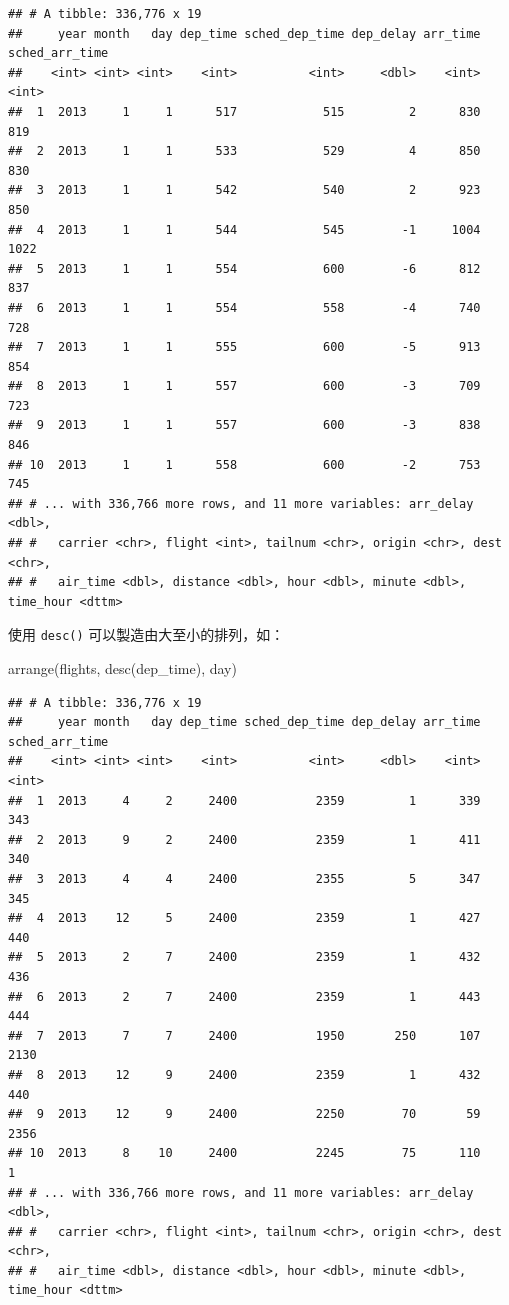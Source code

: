 \documentclass[
]{book}
\newenvironment{Shaded}{\begin{snugshade}}{\end{snugshade}}
\newcommand{\FunctionTok}[1]{\textcolor[rgb]{0.00,0.00,0.00}{#1}}
\newcommand{\NormalTok}[1]{#1}
\theoremstyle{definition}
\theoremstyle{remark}
\begin{document}
\begin{verbatim}
## # A tibble: 336,776 x 19
##     year month   day dep_time sched_dep_time dep_delay arr_time sched_arr_time
##    <int> <int> <int>    <int>          <int>     <dbl>    <int>          <int>
##  1  2013     1     1      517            515         2      830            819
##  2  2013     1     1      533            529         4      850            830
##  3  2013     1     1      542            540         2      923            850
##  4  2013     1     1      544            545        -1     1004           1022
##  5  2013     1     1      554            600        -6      812            837
##  6  2013     1     1      554            558        -4      740            728
##  7  2013     1     1      555            600        -5      913            854
##  8  2013     1     1      557            600        -3      709            723
##  9  2013     1     1      557            600        -3      838            846
## 10  2013     1     1      558            600        -2      753            745
## # ... with 336,766 more rows, and 11 more variables: arr_delay <dbl>,
## #   carrier <chr>, flight <int>, tailnum <chr>, origin <chr>, dest <chr>,
## #   air_time <dbl>, distance <dbl>, hour <dbl>, minute <dbl>, time_hour <dttm>
\end{verbatim}

使用 \texttt{desc()} 可以製造由大至小的排列，如：

\begin{Shaded}
\begin{Highlighting}[]
\FunctionTok{arrange}\NormalTok{(flights, }\FunctionTok{desc}\NormalTok{(dep\_time), day)}
\end{Highlighting}
\end{Shaded}

\begin{verbatim}
## # A tibble: 336,776 x 19
##     year month   day dep_time sched_dep_time dep_delay arr_time sched_arr_time
##    <int> <int> <int>    <int>          <int>     <dbl>    <int>          <int>
##  1  2013     4     2     2400           2359         1      339            343
##  2  2013     9     2     2400           2359         1      411            340
##  3  2013     4     4     2400           2355         5      347            345
##  4  2013    12     5     2400           2359         1      427            440
##  5  2013     2     7     2400           2359         1      432            436
##  6  2013     2     7     2400           2359         1      443            444
##  7  2013     7     7     2400           1950       250      107           2130
##  8  2013    12     9     2400           2359         1      432            440
##  9  2013    12     9     2400           2250        70       59           2356
## 10  2013     8    10     2400           2245        75      110              1
## # ... with 336,766 more rows, and 11 more variables: arr_delay <dbl>,
## #   carrier <chr>, flight <int>, tailnum <chr>, origin <chr>, dest <chr>,
## #   air_time <dbl>, distance <dbl>, hour <dbl>, minute <dbl>, time_hour <dttm>
\end{verbatim}
\end{document}
